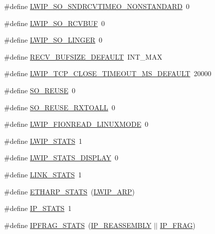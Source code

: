 \begin{DoxyCompactItemize}
\item 
\#define \hyperlink{group__lwip__opts__socket_ga5b115bacb569763d8a3889a12229e942}{L\+W\+I\+P\+\_\+\+S\+O\+\_\+\+S\+N\+D\+R\+C\+V\+T\+I\+M\+E\+O\+\_\+\+N\+O\+N\+S\+T\+A\+N\+D\+A\+RD}~0
\item 
\#define \hyperlink{group__lwip__opts__socket_ga06390cebcf4d13d3d47a11365e5fcd28}{L\+W\+I\+P\+\_\+\+S\+O\+\_\+\+R\+C\+V\+B\+UF}~0
\item 
\#define \hyperlink{group__lwip__opts__socket_gaa91292d5d014dc1c6f1c1f4166269a1d}{L\+W\+I\+P\+\_\+\+S\+O\+\_\+\+L\+I\+N\+G\+ER}~0
\item 
\#define \hyperlink{group__lwip__opts__socket_ga5dbd0a61f30ae6c6bfbda635095f138d}{R\+E\+C\+V\+\_\+\+B\+U\+F\+S\+I\+Z\+E\+\_\+\+D\+E\+F\+A\+U\+LT}~I\+N\+T\+\_\+\+M\+AX
\item 
\#define \hyperlink{group__lwip__opts__socket_ga3e7498d5d2921f0df3792de72f384d36}{L\+W\+I\+P\+\_\+\+T\+C\+P\+\_\+\+C\+L\+O\+S\+E\+\_\+\+T\+I\+M\+E\+O\+U\+T\+\_\+\+M\+S\+\_\+\+D\+E\+F\+A\+U\+LT}~20000
\item 
\#define \hyperlink{group__lwip__opts__socket_gaf3822feed320cf8439b083ee525e4942}{S\+O\+\_\+\+R\+E\+U\+SE}~0
\item 
\#define \hyperlink{group__lwip__opts__socket_gae9395d83af89002343e5782130f52f44}{S\+O\+\_\+\+R\+E\+U\+S\+E\+\_\+\+R\+X\+T\+O\+A\+LL}~0
\item 
\#define \hyperlink{group__lwip__opts__socket_ga0543eea2abe390d0bdc843c33debd762}{L\+W\+I\+P\+\_\+\+F\+I\+O\+N\+R\+E\+A\+D\+\_\+\+L\+I\+N\+U\+X\+M\+O\+DE}~0
\item 
\#define \hyperlink{group__lwip__opts__stats_ga542b58734cc01902c5e099f6efdc5f1b}{L\+W\+I\+P\+\_\+\+S\+T\+A\+TS}~1
\item 
\#define \hyperlink{group__lwip__opts__stats_gacdc38ed58d1900b5d3d109a65be1c3d1}{L\+W\+I\+P\+\_\+\+S\+T\+A\+T\+S\+\_\+\+D\+I\+S\+P\+L\+AY}~0
\item 
\#define \hyperlink{group__lwip__opts__stats_gae58b452782d0327ae728192686c5a84a}{L\+I\+N\+K\+\_\+\+S\+T\+A\+TS}~1
\item 
\#define \hyperlink{group__lwip__opts__stats_ga3a8359abf4fff8ffdc449e5007f93275}{E\+T\+H\+A\+R\+P\+\_\+\+S\+T\+A\+TS}~(\hyperlink{group__lwip__opts__arp_ga9609a014bba4638cc191d6a8f9556c87}{L\+W\+I\+P\+\_\+\+A\+RP})
\item 
\#define \hyperlink{group__lwip__opts__stats_gaf50575a4895e26ea2c01d1f2269487be}{I\+P\+\_\+\+S\+T\+A\+TS}~1
\item 
\#define \hyperlink{group__lwip__opts__stats_gac9a4fbb46df3c0f479a334d0e34fb74f}{I\+P\+F\+R\+A\+G\+\_\+\+S\+T\+A\+TS}~(\hyperlink{group__lwip__opts__ipv4_ga1a31ab0e0f37b17d40fa7c35bc2c4f69}{I\+P\+\_\+\+R\+E\+A\+S\+S\+E\+M\+B\+LY} $\vert$$\vert$ \hyperlink{group__lwip__opts__ipv4_gaf85c8bdd5035b6cada790b4cc2a209a4}{I\+P\+\_\+\+F\+R\+AG})
$$
\end{DoxyCompactItemize}
